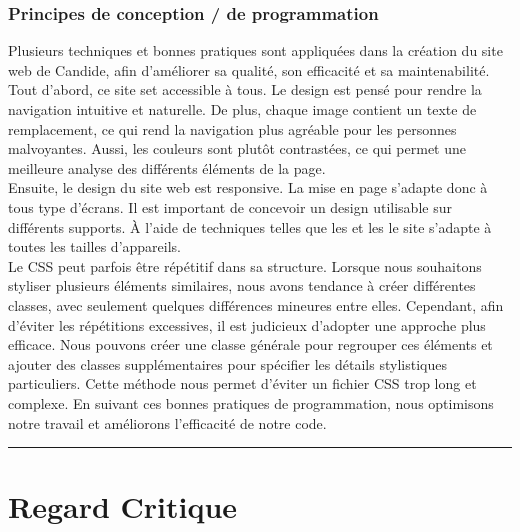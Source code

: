 \documentclass[a4,10pt,french]{sphinxmanual}
\begin{document}
\subsection{Principes de conception / de programmation}
\label{\detokenize{chapitre-02:principes-de-conception-de-programmation}}
\sphinxAtStartPar
Plusieurs techniques et bonnes pratiques sont appliquées dans la création du site web de Candide, afin d’améliorer sa qualité, son efficacité et sa maintenabilité.\\
Tout d’abord, ce site set accessible à tous. Le design est pensé pour rendre la navigation intuitive et naturelle. De plus, chaque image contient un texte de remplacement, ce qui rend la navigation plus agréable pour les personnes malvoyantes. Aussi, les couleurs sont plutôt contrastées, ce qui permet une meilleure analyse des différents éléments de la page.\\
Ensuite, le design du site web est responsive. La mise en page s’adapte donc à tous type d’écrans. Il est important de concevoir un design utilisable sur différents supports. À l’aide de techniques telles que les  et les  le site s’adapte à toutes les tailles d’appareils.\\
Le CSS peut parfois être répétitif dans sa structure. Lorsque nous souhaitons styliser plusieurs éléments similaires, nous avons tendance à créer différentes classes, avec seulement quelques différences mineures entre elles. Cependant, afin d’éviter les répétitions excessives, il est judicieux d’adopter une approche plus efficace. Nous pouvons créer une classe générale pour regrouper ces éléments et ajouter des classes supplémentaires pour spécifier les détails stylistiques particuliers. Cette méthode nous permet d’éviter un fichier CSS trop long et complexe. En suivant ces bonnes pratiques de programmation, nous optimisons notre travail et améliorons l’efficacité de notre code.


\bigskip\hrule\bigskip



\chapter{Regard Critique}
\label{\detokenize{chapitre-03:regard-critique}}\label{\detokenize{chapitre-03::doc}}
\end{document}
